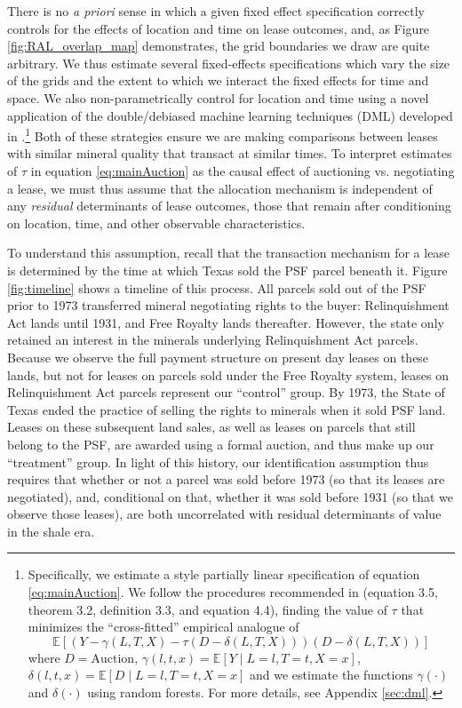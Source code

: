 \documentclass[12pt]{article}
\begin{document}
There is no \textit{a priori} sense in which a given fixed effect specification correctly controls for the effects of location and time on lease outcomes, and, as Figure \ref{fig:RAL_overlap_map} demonstrates, the grid boundaries we draw are quite arbitrary. We thus estimate several fixed-effects specifications which vary the size of the grids and the extent to which we interact the fixed effects for time and space. We also non-parametrically control for location and time using a novel application of the double/debiased machine learning techniques (DML) developed in \cite{chernozhukov2018double}.\footnote{Specifically, we estimate a \cite{robinson1988root} style partially linear specification of equation \ref{eq:mainAuction}.  We follow the procedures recommended in \cite{chernozhukov2018double} (equation 3.5, theorem 3.2, definition 3.3, and equation 4.4), finding the value of $\tau$ that minimizes the ``cross-fitted'' empirical analogue of 
\begin{equation*}
	\mathbb{E}\left[\left(Y - \gamma(L,T,X) - \tau(D - \delta(L,T,X))\right)\left(D - \delta(L,T,X)\right)\right]
\end{equation*}
where $D = \text{Auction}$, $\gamma(l,t,x) = \mathbb{E}\left[Y\mid L = l, T = t, X = x\right]$, $\delta(l,t,x) = \mathbb{E}\left[D\mid L = l, T = t, X = x\right]$ and we estimate the functions $\gamma(\cdot)$ and $\delta(\cdot)$ using random forests.  For more details, see Appendix \ref{sec:dml}.} Both of these strategies ensure we are making comparisons between leases with similar mineral quality that transact at similar times. To interpret estimates of $\tau$ in equation \ref{eq:mainAuction} as the causal effect of auctioning vs. negotiating a lease, we must thus assume that the allocation mechanism is independent of any \textit{residual} determinants of lease outcomes, those that remain after conditioning on location, time, and other observable characteristics. 

To understand this assumption, recall that the transaction mechanism for a lease is determined by the time at which Texas sold the PSF parcel beneath it.  Figure \ref{fig:timeline} shows a timeline of this process. All parcels sold out of the PSF prior to 1973 transferred mineral negotiating rights to the buyer: Relinquishment Act lands until 1931, and Free Royalty lands thereafter. However, the state only retained an interest in the minerals underlying Relinquishment Act parcels. Because we observe the full payment structure on present day leases on these lands, but not for leases on parcels sold under the Free Royalty system, leases on Relinquishment Act parcels represent our ``control'' group.  By 1973, the State of Texas ended the practice of selling the rights to minerals when it sold PSF land. Leases on these subsequent land sales, as well as leases on parcels that still belong to the PSF, are awarded using a formal auction, and thus make up our ``treatment'' group.  In light of this history, our identification assumption thus requires that whether or not a parcel was sold before 1973 (so that its leases are negotiated), and, conditional on that, whether it was sold before 1931 (so that we observe those leases), are both uncorrelated with residual determinants of value in the shale era.
\end{document}
